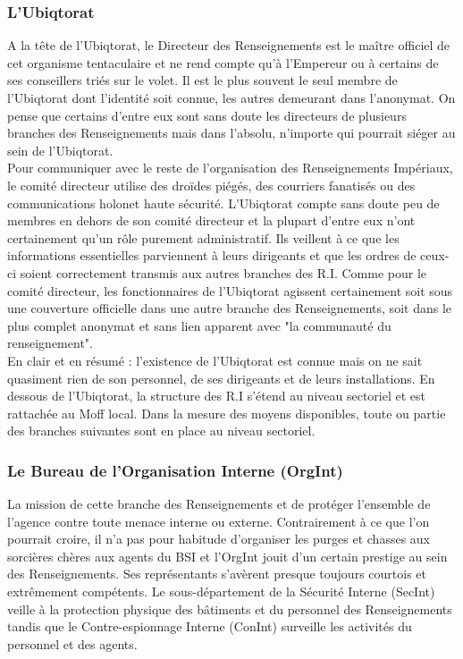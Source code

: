 \documentclass[twoside]{article}
\begin{document}
\subsubsection{L'Ubiqtorat}
A la tête de l'Ubiqtorat, le Directeur des Renseignements est le ma\^{i}tre officiel de cet organisme tentaculaire et ne rend compte qu'à l'Empereur ou à certains de ses conseillers triés sur le volet. Il est le plus souvent le seul membre de l'Ubiqtorat dont l'identité soit connue, les autres demeurant dans l'anonymat. On pense que certains d'entre eux sont sans doute les directeurs de plusieurs branches des Renseignements mais dans l'absolu, n'importe qui pourrait siéger au sein de l'Ubiqtorat.\\

Pour communiquer avec le reste de l'organisation des Renseignements Impériaux, le comité directeur utilise des droïdes piégés, des courriers fanatisés ou des communications holonet haute sécurité. L'Ubiqtorat compte sans doute peu de membres en dehors de son comité directeur et la plupart d'entre eux n'ont certainement qu'un rôle purement administratif. Ils veillent à ce que les informations essentielles parviennent à leurs dirigeants et que les ordres de ceux-ci soient correctement transmis aux autres branches des R.I. Comme pour le comité directeur, les fonctionnaires de l'Ubiqtorat agissent certainement soit sous une couverture officielle dans une autre branche des Renseignements, soit dans le plus complet anonymat et sans lien apparent avec "la communauté du renseignement".\\

En clair et en résumé : l'existence de l'Ubiqtorat est connue mais on ne sait quasiment rien de son personnel, de ses dirigeants et de leurs installations.
En dessous de l'Ubiqtorat, la structure des R.I s'étend au niveau sectoriel et est rattachée au Moff local. Dans la mesure des moyens disponibles, toute ou partie des branches suivantes sont en place au niveau sectoriel. 

\subsubsection{Le Bureau de l'Organisation Interne (OrgInt)}
La mission de cette branche des Renseignements et de protéger l'ensemble de l'agence contre toute menace interne ou externe. Contrairement à ce que l'on pourrait croire, il n'a pas pour habitude d'organiser les purges et chasses aux sorcières chères aux agents du BSI et l'OrgInt jouit d'un certain prestige au sein des Renseignements. Ses représentants s'avèrent presque toujours courtois et extrêmement compétents. Le sous-département de la Sécurité Interne (SecInt) veille à la protection physique des bâtiments et du personnel des Renseignements tandis que le Contre-espionnage Interne (ConInt) surveille les activités du personnel et des agents.
 
\end{document}
